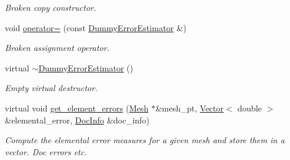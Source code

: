 \begin{DoxyCompactItemize}
\begin{DoxyCompactList}\small\item\em Broken copy constructor. \end{DoxyCompactList}\item 
void \hyperlink{classoomph_1_1DummyErrorEstimator_a001f55cc9e376d626a82147fed7f08f1}{operator=} (const \hyperlink{classoomph_1_1DummyErrorEstimator}{Dummy\+Error\+Estimator} \&)
\begin{DoxyCompactList}\small\item\em Broken assignment operator. \end{DoxyCompactList}\item 
virtual \hyperlink{classoomph_1_1DummyErrorEstimator_ac379252c48c85e03d9a5bc8b8c0d2d5e}{$\sim$\+Dummy\+Error\+Estimator} ()
\begin{DoxyCompactList}\small\item\em Empty virtual destructor. \end{DoxyCompactList}\item 
virtual void \hyperlink{classoomph_1_1DummyErrorEstimator_a471038816556f1af7602cadbbb21d8fb}{get\+\_\+element\+\_\+errors} (\hyperlink{classoomph_1_1Mesh}{Mesh} $\ast$\&mesh\+\_\+pt, \hyperlink{classoomph_1_1Vector}{Vector}$<$ double $>$ \&elemental\+\_\+error, \hyperlink{classoomph_1_1DocInfo}{Doc\+Info} \&doc\+\_\+info)
\begin{DoxyCompactList}\small\item\em Compute the elemental error measures for a given mesh and store them in a vector. Doc errors etc. \end{DoxyCompactList}\end{DoxyCompactItemize}
